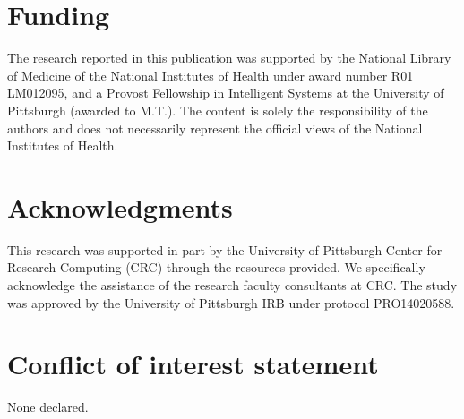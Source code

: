 \section{Funding}\label{sec:funding}
The research reported in this publication was supported by the National Library of Medicine of the National Institutes of Health under award number R01 LM012095, and a Provost Fellowship in Intelligent Systems at the University of Pittsburgh (awarded to M.T.). The content is solely the responsibility of the authors and does not necessarily represent the official views of the National Institutes of Health.


\section{Acknowledgments}\label{sec:ACKNOWLEDGMENTS}
This research was supported in part by the University of Pittsburgh Center for Research Computing (CRC) through the resources provided. We specifically acknowledge the assistance of the research faculty consultants at CRC. The study was approved by the University of Pittsburgh IRB under protocol PRO14020588.

\section{Conflict of interest statement}
None declared.
